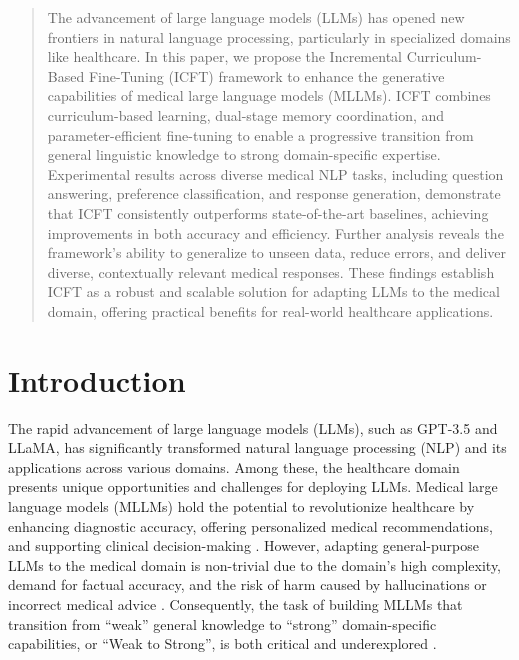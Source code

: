 \begin{abstract}
The advancement of large language models (LLMs) has opened new frontiers in natural language processing, particularly in specialized domains like healthcare. In this paper, we propose the Incremental Curriculum-Based Fine-Tuning (ICFT) framework to enhance the generative capabilities of medical large language models (MLLMs). ICFT combines curriculum-based learning, dual-stage memory coordination, and parameter-efficient fine-tuning to enable a progressive transition from general linguistic knowledge to strong domain-specific expertise. Experimental results across diverse medical NLP tasks, including question answering, preference classification, and response generation, demonstrate that ICFT consistently outperforms state-of-the-art baselines, achieving improvements in both accuracy and efficiency. Further analysis reveals the framework's ability to generalize to unseen data, reduce errors, and deliver diverse, contextually relevant medical responses. These findings establish ICFT as a robust and scalable solution for adapting LLMs to the medical domain, offering practical benefits for real-world healthcare applications.
\end{abstract}


\section{Introduction}

The rapid advancement of large language models (LLMs), such as GPT-3.5 and LLaMA, has significantly transformed natural language processing (NLP) and its applications across various domains. Among these, the healthcare domain presents unique opportunities and challenges for deploying LLMs. Medical large language models (MLLMs) hold the potential to revolutionize healthcare by enhancing diagnostic accuracy, offering personalized medical recommendations, and supporting clinical decision-making \cite{sharaf2023biobert,zhou2025training}. However, adapting general-purpose LLMs to the medical domain is non-trivial due to the domain's high complexity, demand for factual accuracy, and the risk of harm caused by hallucinations or incorrect medical advice \cite{khalid2024role}. Consequently, the task of building MLLMs that transition from ``weak'' general knowledge to ``strong'' domain-specific capabilities, or ``Weak to Strong'', is both critical and underexplored \cite{zhou2024weak}.

